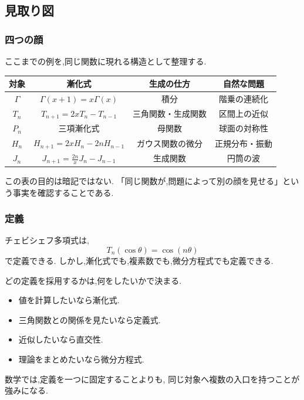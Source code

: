 \subsection{見取り図}

\subsubsection{四つの顔}

ここまでの例を,同じ関数に現れる構造として整理する.

\begin{center}
\begin{tabular}{c|c|c|c}
  対象 & 漸化式 & 生成の仕方 & 自然な問題\\ \hline
  $\Gamma$ & $\Gamma(x+1)=x\Gamma(x)$
    & 積分 & 階乗の連続化\\
  $T_n$ & $T_{n+1}=2xT_n-T_{n-1}$
    & 三角関数・生成関数 & 区間上の近似\\
  $P_n$ & 三項漸化式
    & 母関数 & 球面の対称性\\
  $H_n$ & $H_{n+1}=2xH_n-2nH_{n-1}$
    & ガウス関数の微分 & 正規分布・振動\\
  $J_n$ & $J_{n+1}=\frac{2n}{x}J_n-J_{n-1}$
    & 生成関数 & 円筒の波\\
\end{tabular}
\end{center}

この表の目的は暗記ではない.
「同じ関数が,問題によって別の顔を見せる」という事実を確認することである.

\subsubsection{定義}

チェビシェフ多項式は,
\[
  T_n(\cos\theta)=\cos(n\theta)
\]
で定義できる.
しかし,漸化式でも,複素数でも,微分方程式でも定義できる.

どの定義を採用するかは,何をしたいかで決まる.

\begin{itemize}
  \item 値を計算したいなら漸化式.
  \item 三角関数との関係を見たいなら定義式.
  \item 近似したいなら直交性.
  \item 理論をまとめたいなら微分方程式.
\end{itemize}

数学では,定義を一つに固定することよりも,
同じ対象へ複数の入口を持つことが強みになる.

